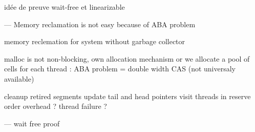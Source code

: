idée de preuve wait-free et linearizable


---
Memory reclamation is not easy because of ABA problem

memory reclemation for system without garbage collector

malloc is not non-blocking, own allocation mechanism or we allocate a pool of
cells for each thread : ABA problem = double width CAS (not universaly
available)

cleanup retired segments
update tail and head pointers
visit threads in reserve order
overhead ?
thread failure ?

---
wait free proof
